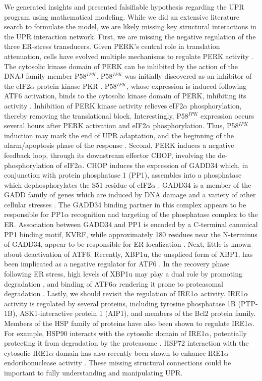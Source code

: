 \documentclass[fleqn,10pt]{wlscirep}
\begin{document}
We generated insights and presented falsifiable hypothesis regarding the UPR program using mathematical modeling.
While we did an extensive literature search to formulate the model, we are likely missing key structural interactions in the UPR interaction network.
First, we are missing the negative regulation of the three ER-stress transducers.
Given PERK's central role in translation attenuation, cells have evolved multiple mechanisms to regulate PERK activity \cite{Lee:1990ye}.
The cytosolic kinase domain of PERK can be inhibited by the action of the DNAJ family member P58$^{IPK}$.
P58$^{IPK}$ was initially discovered as an inhibitor of the eIF2$\alpha$ protein kinase PKR \cite{Lee:1990ye}.
P58$^{IPK}$, whose expression is induced following ATF6 activation, binds to the cytosolic kinase domain of PERK, inhibiting its activity \cite{Yan:2002fk,Huizen:2003qo}.
Inhibition of PERK kinase activity relieves eIF2$\alpha$ phosphorylation, thereby removing the translational block.
Interestingly, P58$^{IPK}$ expression occurs several hours after PERK activation and eIF2$\alpha$ phosphorylation.
Thus, P58$^{IPK}$ induction may mark the end of UPR adaptation, and the beginning of the alarm/apoptosis phase of the response \cite{szegezdi2006mediators}.
Second, PERK induces a negative feedback loop, through its downstream effector CHOP, involving the de-phosphorylation of eIF2$\alpha$.
CHOP induces the expression of GADD34 which, in conjunction with protein phosphatase 1 (PP1), assembles into a phosphatase which dephosphorylates the S51 residue of eIF2$\alpha$ \cite{Novoa:2001mb}. GADD34 is a member of the GADD family of genes which are induced by DNA damage and a variety of other cellular stresses \cite{Zhan:1994cq}.
The GADD34 binding partner in this complex appears to be responsible for PP1$\alpha$ recognition and targeting of the phosphatase complex to the ER.
Association between GADD34 and PP1 is encoded by a C-terminal canonical PP1 binding motif, KVRF, while approximately 180 residues near the N-terminus of GADD34, appear to be responsible for ER localization \cite{Brush:2003kh}.
Next, little is known about deactivation of ATF6. Recently, XBP1u, the unspliced form of XBP1, has been implicated as a negative regulator for ATF6 \cite{Yoshida:2009bs}.
In the recovery phase following ER stress, high levels of XBP1u may play a dual role by promoting degradation \cite{Yoshida:2006dz, Tirosh:2006fv},
and binding of ATF6$\alpha$ rendering it prone to proteasomal degradation \cite{Yoshida:2009bs}.
Lastly, we should revisit the regulation of IRE1$\alpha$ activity.
IRE1$\alpha$ activity is regulated by several proteins, including tyrosine phosphatase 1B (PTP-1B), ASK1-interactive protein 1 (AIP1), and members of the Bcl2 protein family.
Members of the HSP family of proteins have also been shown to regulate IRE1$\alpha$.
For example, HSP90 interacts with the cytosolic domain of IRE1$\alpha$, potentially protecting it from degradation by the proteasome \cite{Marcu:2002oq}.
HSP72 interaction with the cytosolic IRE1$\alpha$ domain has also recently been shown to enhance IRE1$\alpha$ endoribonuclease activity \cite{Gupta:2010kl}.
These missing structural connections could be important to fully understanding and manipulating UPR.
\end{document}
